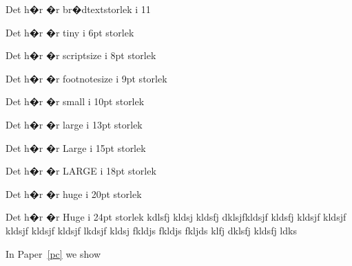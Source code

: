\normalsize{Det h�r �r br�dtextstorlek i 11}

\tiny{Det h�r �r tiny i 6pt storlek}

\scriptsize{Det h�r �r scriptsize i 8pt storlek}

\footnotesize{Det h�r �r footnotesize i 9pt storlek}

\small{Det h�r �r small i 10pt storlek}

\large{Det h�r �r large i 13pt storlek}

\Large{Det h�r �r Large i 15pt storlek}

\LARGE{Det h�r �r LARGE i 18pt storlek}

\huge{Det h�r �r huge i 20pt storlek}

\Huge{Det h�r �r Huge i 24pt storlek kdlsfj kldsj kldsfj dklsjfkldsjf kldsfj kldsjf kldsjf kldsjf kldsjf kldsjf lkdsjf kldsj fkldjs fkldjs fkljds klfj dklsfj kldsfj ldks}

\normalsize

In Paper~\ref{pc} we show
